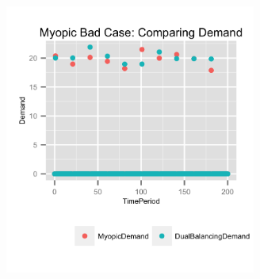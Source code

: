 \documentclass{beamer}
\begin{document}

\begin{frame}
  \includegraphics[height=3.5in]{figures/MyopicBadDemand.png}
\end{frame}
\end{document}
